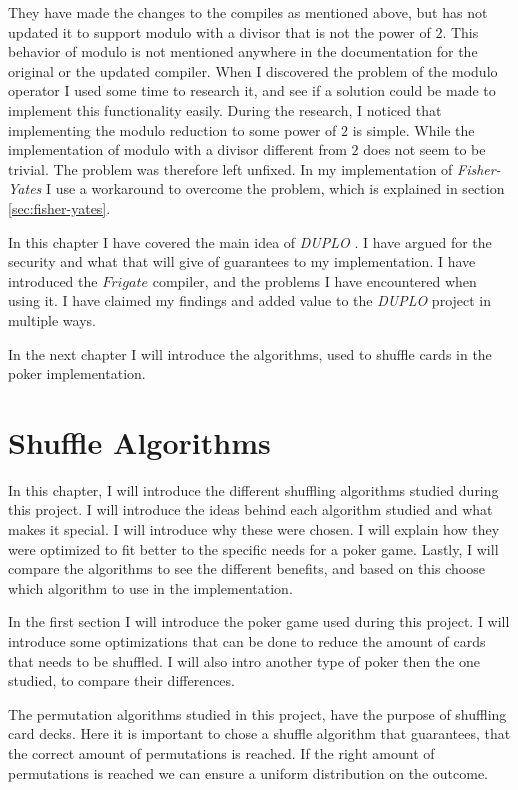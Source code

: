 \documentclass[twoside,11pt,openright]{report}
\newcommand{\FY}{\textit{Fisher-Yates} }
\newcommand{\DUPLO}{\textit{DUPLO} }
\begin{document}
They have made the changes to the compiles as mentioned above, but has not updated it to support modulo with a divisor that is not the power of $2$. This behavior of modulo is not mentioned anywhere in the documentation for the original or the updated compiler. When I discovered the problem of the modulo operator I used some time to research it, and see if a solution could be made to implement this functionality easily. During the research, I noticed that implementing the modulo reduction to some power of $2$ is simple. While the implementation of modulo with a divisor different from $2$ does not seem to be trivial. The problem was therefore left unfixed. In my implementation of \FY I use a workaround to overcome the problem, which is explained in section \ref{sec:fisher-yates}.

\bigskip

In this chapter I have covered the main idea of \DUPLO. I have argued for the security and what that will give of guarantees to my implementation. I have introduced the $Frigate$ compiler, and the problems I have encountered when using it. I have claimed my findings and added value to the \DUPLO project in multiple ways.

In the next chapter I will introduce the algorithms, used to shuffle cards in the poker implementation.


\chapter{Shuffle Algorithms}
\label{ch:shuffle}
In this chapter, I will introduce the different shuffling algorithms studied during this project. I will introduce the ideas behind each algorithm studied and what makes it special. I will introduce why these were chosen. I will explain how they were optimized to fit better to the specific needs for a poker game. Lastly, I will compare the algorithms to see the different benefits, and based on this choose which algorithm to use in the implementation.

In the first section I will introduce the poker game used during this project. I will introduce some optimizations that can be done to reduce the amount of cards that needs to be shuffled. I will also intro another type of poker then the one studied, to compare their differences.

The permutation algorithms studied in this project, have the purpose of shuffling card decks. Here it is important to chose a shuffle algorithm that guarantees, that the correct amount of permutations is reached. If the right amount of permutations is reached we can ensure a uniform distribution on the outcome.
\end{document}

